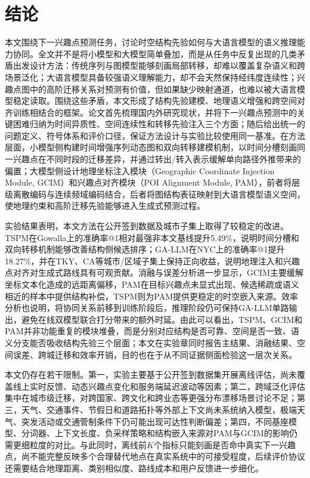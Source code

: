 \chapter*{结论}
\label{chap:conclusion}

本文围绕下一兴趣点预测任务，讨论时空结构先验如何与大语言模型的语义推理能力协同。全文并不是将小模型和大模型简单叠加，而是从任务中反复出现的几类矛盾出发设计方法：传统序列与图模型能够刻画局部转移，却难以覆盖复杂语义和跨场景泛化；大语言模型具备较强语义理解能力，却不会天然保持经纬度连续性；兴趣点图中的高阶迁移关系对预测有价值，但如果缺少映射通道，也难以被大语言模型稳定读取。围绕这些矛盾，本文形成了结构先验建模、地理语义增强和跨空间对齐训练相结合的框架。论文首先梳理国内外研究现状，并将下一兴趣点预测中的关键困难归纳为时间异质性、空间连续性和转移先验注入三个方面；随后给出统一的问题定义、符号体系和评价口径，保证方法设计与实验比较使用同一基准。在方法层面，小模型侧构建时间增强序列动态图和双向转移建模机制，以时间分槽刻画同一兴趣点在不同时段的迁移差异，并通过转出/转入表示缓解单向路径外推带来的偏置；大模型侧设计地理坐标注入模块（Geographic Coordinate Injection Module, GCIM）和兴趣点对齐模块（POI Alignment Module, PAM），前者将层级离散编码与连续频域编码结合，后者将图结构表征映射到大语言模型语义空间，使地理约束和高阶迁移先验能够进入生成式预测过程。

实验结果表明，本文方法在公开签到数据及城市子集上取得了较稳定的改进。TSPM在Gowalla上的准确率@1相对最强非本文基线提升5.49\%，说明时间分槽和双向转移机制能够改善结构侧候选排序；GA-LLM在NYC上的准确率@1提升18.27\%，并在TKY、CA等城市/区域子集上保持正向收益，说明地理注入和兴趣点对齐对生成式路线具有可观贡献。消融与误差分析进一步显示，GCIM主要缓解坐标文本化造成的远距离偏移，PAM在目标兴趣点未显式出现、候选稀疏或语义相近的样本中提供结构补偿，TSPM则为PAM提供更稳定的时空嵌入来源。效率分析也说明，将协同关系前移到训练阶段后，推理阶段仍可保持GA-LLM单路输出，避免在线双模型联合打分带来的额外时延。由此可以看出，TSPM、GCIM和PAM并非功能重复的模块堆叠，而是分别对应结构是否可靠、空间是否一致、语义分支能否吸收结构先验三个层面；本文在实验章同时报告主结果、消融结果、空间误差、跨城迁移和效率开销，目的也在于从不同证据侧面检验这一层次关系。

本文仍存在若干限制。第一，实验主要基于公开签到数据集开展离线评估，尚未覆盖线上实时反馈、动态兴趣点变化和服务端延迟波动等因素；第二，跨域泛化评估集中在城市级迁移，对跨国家、跨文化和跨业态等更强分布漂移场景讨论不足；第三，天气、交通事件、节假日和道路拓扑等外部上下文尚未系统纳入模型，极端天气、突发活动或交通管制条件下仍可能出现可达性判断偏差；第四，不同基座模型、分词器、上下文长度、负采样策略和结构嵌入来源对PAM与GCIM的影响仍需更细粒度的对比。与此同时，离线前$K$个指标只能刻画是否命中真实下一兴趣点，尚不能完整反映多个合理替代地点在真实系统中的可接受程度，后续评价协议还需要结合地理距离、类别相似度、路线成本和用户反馈进一步细化。

